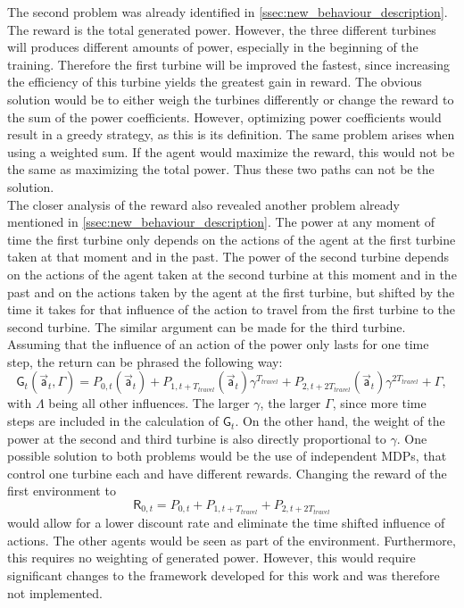 The second problem was already identified in \autoref{ssec:new_behaviour_description}. The reward is the total generated power. However, the three different turbines will produces different amounts of power, especially in the beginning of the training. Therefore the first turbine will be improved the fastest, since increasing the efficiency of this turbine yields the greatest gain in reward. The obvious solution would be to either weigh the turbines differently or change the reward to the sum of the power coefficients. However, optimizing power coefficients would result in a greedy strategy, as this is its definition. The same problem arises when using a weighted sum. If the agent would maximize the reward, this would not be the same as maximizing the total power. Thus these two paths can not be the solution. \\
The closer analysis of the reward also revealed another problem already mentioned in \autoref{ssec:new_behaviour_description}. The power at any moment of time the first turbine only depends on the actions of the agent at the first turbine taken at that moment and in the past. The power of the second turbine depends on the actions of the agent taken at the second turbine at this moment and in the past and on the actions taken by the agent at the first turbine, but shifted by the time it takes for that influence of the action to travel from the first turbine to the second turbine. The similar argument can be made for the third turbine. Assuming that the influence of an action of the power only lasts for one time step, the return can be phrased the following way:
\begin{equation}
\mathsf{G}_t(\vec{\mathsf{a}}_t, \Gamma) = P_{0,t}(\vec{\mathsf{a}}_t) +P_{1,t+T_{travel}}(\vec{\mathsf{a}}_t) \gamma^{T_{travel}} +P_{2,t+2T_{travel}}(\vec{\mathsf{a}}_t)\gamma^{2T_{travel}} + \Gamma,
\end{equation}
with $\Lambda$ being all other influences. The larger $\gamma$, the larger $\Gamma$, since more time steps are included in the calculation of $\mathsf{G}_t$. On the other hand, the weight of the power at the second and third turbine is also directly proportional to $\gamma$. One possible solution to both problems would be the use of independent MDPs, that control one turbine each and have different rewards. Changing the reward of the first environment to 
\begin{equation}
	\mathsf{R}_{0,t} = P_{0,t} +P_{1,t+T_{travel}} +P_{2,t+2T_{travel}}
\end{equation}
would allow for a lower discount rate and eliminate the time shifted influence of actions. The other agents would be seen as part of the environment. Furthermore, this requires no weighting of generated power. However, this would require significant changes to the framework developed for this work and was therefore not implemented. \\